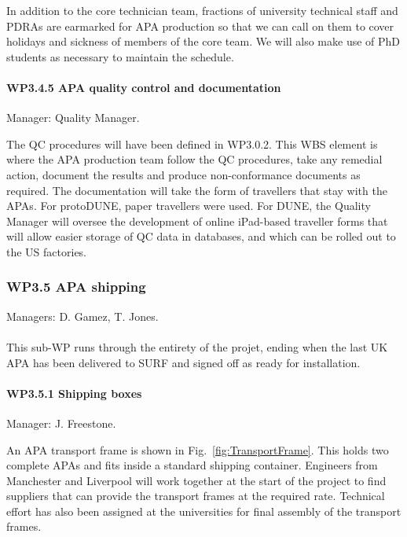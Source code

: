 
In addition to the core technician team, fractions of university technical staff and PDRAs are earmarked for APA production so that we can call on them to cover holidays and sickness of members of the core team. We will also make use of PhD students as necessary to maintain the schedule.


\paragraph{WP3.4.5 APA quality control and documentation} Manager: Quality Manager.

The QC procedures will have been defined in WP3.0.2. This WBS element is where the APA production team follow the QC procedures, take any remedial action, document the results and produce non-conformance documents as required. The documentation will take the form of travellers that stay with the APAs. For protoDUNE, paper travellers were used. For DUNE, the Quality Manager will oversee the development of online iPad-based traveller forms that will allow easier storage of QC data in databases, and which can be rolled out to the US factories.

\subsubsection{WP3.5 APA shipping} Managers: D. Gamez, T. Jones.\\
\\ This sub-WP runs through the entirety of the projet, ending when the last UK APA has been delivered to SURF and signed off as ready for installation.

\paragraph{WP3.5.1 Shipping boxes} Manager: J. Freestone.

An APA transport frame is shown in Fig.~\ref{fig:TransportFrame}. This holds two complete APAs and fits inside a standard shipping container. Engineers from Manchester and Liverpool will work together at the start of the project to find suppliers that can provide the transport frames at the required rate. Technical effort has also been assigned at the universities for final assembly of the transport frames.

